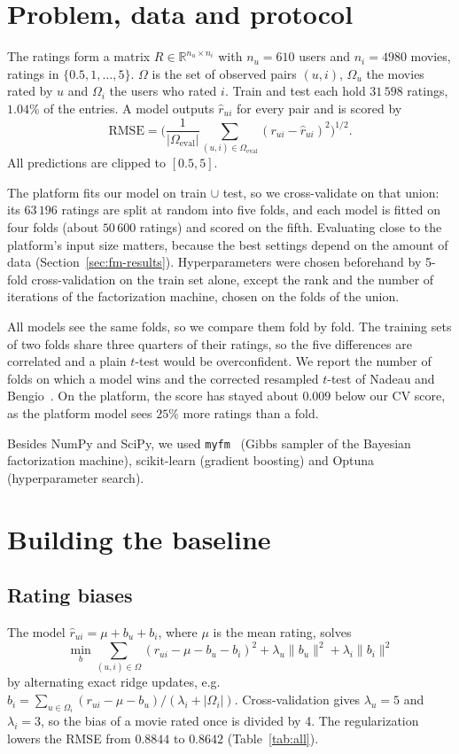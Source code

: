 \documentclass[10pt,a4paper,twocolumn]{article}
\newcommand{\R}{\mathbb{R}}
\newcommand{\rhat}{\hat r}
\begin{document}
\section{Problem, data and protocol}

The ratings form a matrix $R \in \R^{n_u \times n_i}$ with $n_u = 610$ users and $n_i = 4980$ movies,
ratings in $\{0.5, 1, \dots, 5\}$. $\Omega$ is the set of observed pairs $(u,i)$, $\Omega_u$ the movies
rated by $u$ and $\Omega_i$ the users who rated $i$. Train and test each hold $31\,598$ ratings, $1.04\%$ of
the entries. A model outputs $\rhat_{ui}$ for every pair and is scored by
\[
\mathrm{RMSE} = \Big(\frac{1}{|\Omega_{\text{eval}}|}\sum_{(u,i)\in\Omega_{\text{eval}}} (r_{ui}-\rhat_{ui})^2\Big)^{1/2}.
\]
All predictions are clipped to $[0.5, 5]$.

The platform fits our model on train $\cup$ test, so we cross-validate on that union: its $63\,196$ ratings
are split at random into five folds, and each model is fitted on four folds (about $50\,600$ ratings) and
scored on the fifth. Evaluating close to the platform's input size matters, because the best settings depend
on the amount of data (Section~\ref{sec:fm-results}). Hyperparameters were chosen beforehand by 5-fold
cross-validation on the train set alone, except the rank and the number of iterations of the factorization
machine, chosen on the folds of the union.

All models see the same folds, so we compare them fold by fold. The training sets of two folds share three
quarters of their ratings, so the five differences are correlated and a plain $t$-test would be overconfident.
We report the number of folds on which a model wins and the corrected resampled $t$-test of Nadeau and
Bengio~\cite{nadeau}. On the platform, the score has stayed about $0.009$ below our CV score, as the platform
model sees $25\%$ more ratings than a fold.

Besides NumPy and SciPy, we used \texttt{myfm}~\cite{myfm} (Gibbs sampler of the Bayesian factorization
machine), scikit-learn (gradient boosting) and Optuna (hyperparameter search).

\section{Building the baseline}

\subsection{Rating biases}
The model $\rhat_{ui} = \mu + b_u + b_i$, where $\mu$ is the mean rating, solves
\[
\min_{b} \sum_{(u,i)\in\Omega} (r_{ui} - \mu - b_u - b_i)^2 + \lambda_u \lVert b_u\rVert^2 + \lambda_i \lVert b_i\rVert^2
\]
by alternating exact ridge updates, e.g.\ $b_i = \sum_{u\in\Omega_i}(r_{ui}-\mu-b_u)/(\lambda_i+|\Omega_i|)$.
Cross-validation gives $\lambda_u = 5$ and $\lambda_i = 3$, so the bias of a movie rated once is divided by 4.
The regularization lowers the RMSE from $0.8844$ to $0.8642$ (Table~\ref{tab:all}).
\end{document}

